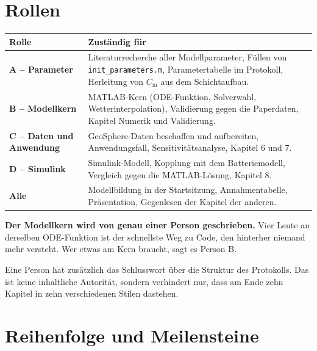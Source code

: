 \documentclass[11pt,a4paper]{scrartcl}
\newcommand{\Cm}{C_\mathrm{m}}
\begin{document}
\section{Rollen}

\begin{longtable}{l p{}}
  \toprule
  Rolle & Zust\"andig f\"ur \\
  \midrule
  \endhead
  \textbf{A -- Parameter} &
    Literaturrecherche aller Modellparameter, F\"ullen von
    \texttt{init\_parameters.m}, Parametertabelle im Protokoll,
    Herleitung von $\Cm$ aus dem Schichtaufbau. \\
  \addlinespace
  \textbf{B -- Modellkern} &
    MATLAB-Kern (ODE-Funktion, Solverwahl, Wetterinterpolation),
    Validierung gegen die Paperdaten, Kapitel Numerik und Validierung. \\
  \addlinespace
  \textbf{C -- Daten und Anwendung} &
    GeoSphere-Daten beschaffen und aufbereiten, Anwendungsfall,
    Sensitivit\"atsanalyse, Kapitel 6 und 7. \\
  \addlinespace
  \textbf{D -- Simulink} &
    Simulink-Modell, Kopplung mit dem Batteriemodell, Vergleich gegen die
    MATLAB-L\"osung, Kapitel 8. \\
  \addlinespace
  \textbf{Alle} &
    Modellbildung in der Startsitzung, Annahmentabelle, Pr\"asentation,
    Gegenlesen der Kapitel der anderen. \\
  \bottomrule
\end{longtable}

\begin{merke}
\textbf{Der Modellkern wird von genau einer Person geschrieben.} Vier Leute
an derselben ODE-Funktion ist der schnellste Weg zu Code, den hinterher
niemand mehr versteht. Wer etwas am Kern braucht, sagt es Person B.
\end{merke}

Eine Person hat zus\"atzlich das Schlusswort \"uber die Struktur des
Protokolls. Das ist keine inhaltliche Autorit\"at, sondern verhindert nur,
dass am Ende zehn Kapitel in zehn verschiedenen Stilen dastehen.

\section{Reihenfolge und Meilensteine}
\end{document}
